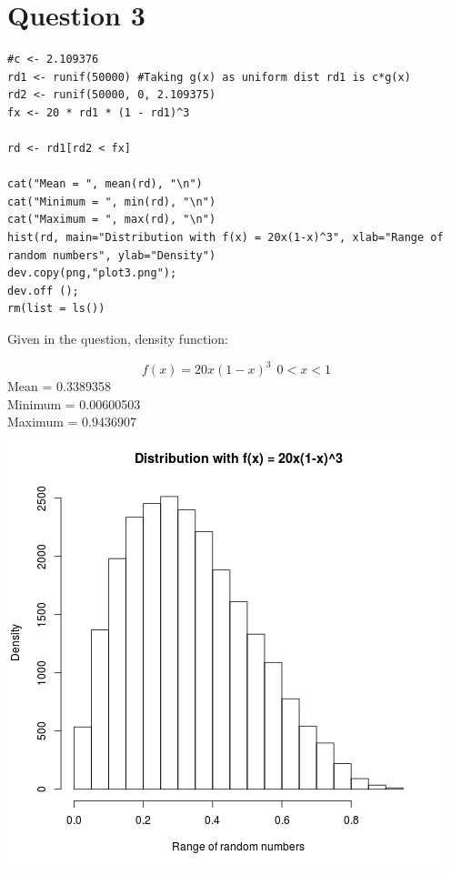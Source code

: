 \documentclass{article}
\begin{document}
\section{Question 3}



\begin{lstlisting}
#c <- 2.109376
rd1 <- runif(50000) #Taking g(x) as uniform dist rd1 is c*g(x)
rd2 <- runif(50000, 0, 2.109375)
fx <- 20 * rd1 * (1 - rd1)^3

rd <- rd1[rd2 < fx]

cat("Mean = ", mean(rd), "\n")
cat("Minimum = ", min(rd), "\n")
cat("Maximum = ", max(rd), "\n")
hist(rd, main="Distribution with f(x) = 20x(1-x)^3", xlab="Range of random numbers", ylab="Density")
dev.copy(png,"plot3.png");
dev.off ();
rm(list = ls())
\end{lstlisting}

Given in the question, density function:

$$f(x) = 20x(1-x)^3 \ \ 0<x<1$$
Mean =  0.3389358 \\
Minimum =  0.00600503 \\
Maximum =  0.9436907 \\

\includegraphics{"plot3"}
\pagebreak
\end{document}
